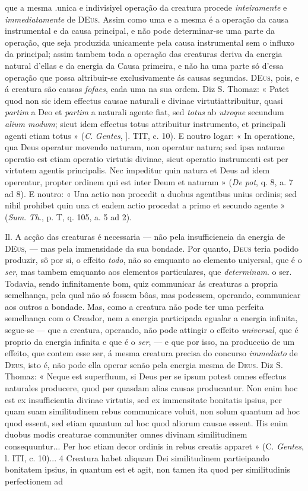 que a mesma .unica e indivisiyel operação da creatura procede \emph{inteiramente} e \emph{immediatamente} de \textsc{DEus}. Assim como uma e a mesma é a operação da causa instrumental e da causa principal, e não pode determinar-se uma parte da operação, que seja produzida unicamente pela causa instrumental sem o influxo da principal; assim tambem toda a operação das creaturas deriva da energia natural d'ellas e da energia da Causa primeira, e não ha uma parte só d'essa operação que possa altribuir-se exclusivamente ás causas segundas. \textsc{DEus}, pois, e á creatura são causas \emph{fofaes}, cada uma na sua ordem. Diz S. Thomaz: « Patet quod non sic idem effectus causae naturali e divinae virtutiattribuitur, quasi \emph{partim} a Deo et \emph{partim} a naturali agente fiat, sed \emph{totus} ab \emph{utroque} secundum \emph{alium modwm}; sicut idem effectus totus attribuitur instrumento, et principali agenti etiam totus » (\emph{C}. \emph{Gentes}, ]. TIT, c. 10). E noutro logar: « In operatione, qua Deus operatur movendo naturam, non operatur natura; sed ipsa naturae operatio est etiam operatio virtutis divinae, sicut operatio instrumenti est per virtutem agentis principalis. Nec impeditur quin natura et Deus ad idem operentur, propter ordinem qui est inter Deum et naturam » (\emph{De pot}, q. 8, a. 7 ad 8). E noutro: « Una actio non procedit a duobus agentibus unius ordinis; sed nihil prohibet quin una ct eadem actio procedat a primo et secundo agente » (\emph{Sum}. \emph{Th}., p. T, q. 105, a. 5 ad 2).\par Il. A acção das creaturas é necessaria --- não pela insufficieneia da energia de \textsc{DEus}, --- mas pela immensidade da sua bondade. Por quanto, \textsc{Deus} teria podido produzir, sô por si, o effeito \emph{todo}, não so emquanto ao elemento uniyersal, que é o \emph{ser}, mas tambem emquanto aos elementos particulares, que \emph{determinam}. o ser. Todavia, sendo infinitamente bom, quiz communicar ás creaturas a propria semelhança, pela qual não só fossem bôas, mas podessem, operando, communicar aos outros a bondade. Mas, como a creatura não pode ter uma perfeita semelhança com o Creador, nem a energia participada egualar a energia infinita, segue-se --- que a creatura, operando, não pode attingir o effeito \emph{universal}, que é proprio da energia infinita e que é o \emph{ser}, --- e que por isso, na produecüo de um effeito, que contem esse ser, á mesma creatura precisa do concurso \emph{immediato} de \textsc{Deus}, isto é, não pode ella operar senão pela energia mesma de \textsc{Deus}. Diz S. Thomaz: « Neque est superfluum, si Deus per se ipsum potest omnes effectus naturales producere, quod per quasdam alias causas producantur. Non enim hoc est ex insufficientia divinae virtutis, sed ex immensitate bonitatis ipsius, per quam suam similitudinem rebus communicare voluit, non solum quantum ad hoc quod essent, sed etiam quantum ad hoc quod aliorum causae essent. His enim duobus modis creaturae communiter omnes divinam similitudinem consequuntur... Per hoc etiam decor ordinis in rebus creatis apparet » (C. \emph{Gentes}, l. ITI, c. 10)... 4 Creatura habet aliquam Dei similitudinem partieipando bonitatem ipsius, in quantum est et agit, non tamen ita quod per similitudinis perfectionem ad 